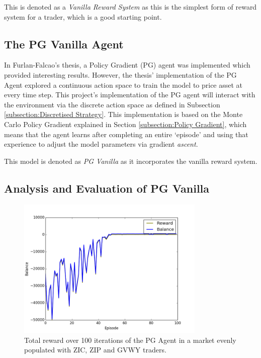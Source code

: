\documentclass[ %
                    author={Ashwinder Khurana},
                supervisor={Prof Dave Cliff},
                    degree={MEng},
                     title={The Deeply Reinforced Trader},
                  subtitle={},
                      type={enterprise},
                      year={2020} ]{dissertation}
\begin{document}
{\noindent
This is denoted as a \textit{Vanilla Reward System} as this is the simplest form of reward system for a trader, which is a good starting point. 

\subsection{The PG Vanilla Agent}
In Furlan-Falcao's thesis, a Policy Gradient (PG) agent was implemented which provided interesting results. However, the thesis' implementation of the PG Agent explored a continuous action space to train the model to price asset at every time step. This project's implementation of the PG agent will interact with the environment via the discrete action space as defined in Subsection \ref{subsection:Discretised Strategy}. This implementation is based on the Monte Carlo Policy Gradient explained in Section \ref{subsection:Policy Gradient}, which means that the agent learns after completing an entire \enquote*{episode} and using that experience to adjust the model parameters via gradient \textit{ascent}.
 
\noindent 
This model is denoted as \textit{PG Vanilla} as it incorporates the vanilla reward system. 
\subsection{Analysis and Evaluation of PG Vanilla}
\label{subsection:Analysis and Evaluation of PG Vanilla}
\begin{figure}[H]
	\centering
  	\includegraphics[width=0.8\textwidth]{PG-Vanilla-Reward.png}
  	\caption{Total reward over 100 iterations of the PG Agent in a market evenly populated with ZIC, ZIP and GVWY traders. }
	\label{fig:PG-Vanilla-Reward}  
\end{figure}

}
\end{document}
